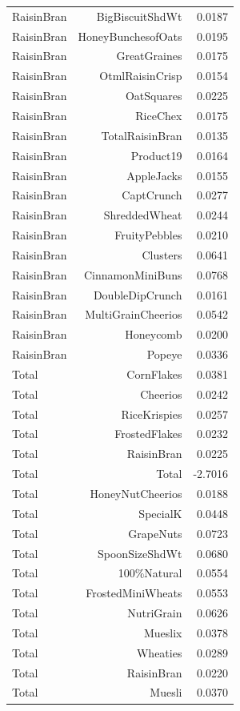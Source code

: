 \begin{longtable}{@{}lrr@{}}
RaisinBran & BigBiscuitShdWt & 0.0187 \\
RaisinBran & HoneyBunchesofOats & 0.0195 \\
RaisinBran & GreatGraines & 0.0175 \\
RaisinBran & OtmlRaisinCrisp & 0.0154 \\
RaisinBran & OatSquares & 0.0225 \\
RaisinBran & RiceChex & 0.0175 \\
RaisinBran & TotalRaisinBran & 0.0135 \\
RaisinBran & Product19 & 0.0164 \\
RaisinBran & AppleJacks & 0.0155 \\
RaisinBran & CaptCrunch & 0.0277 \\
RaisinBran & ShreddedWheat & 0.0244 \\
RaisinBran & FruityPebbles & 0.0210 \\
RaisinBran & Clusters & 0.0641 \\
RaisinBran & CinnamonMiniBuns & 0.0768 \\
RaisinBran & DoubleDipCrunch & 0.0161 \\
RaisinBran & MultiGrainCheerios & 0.0542 \\
RaisinBran & Honeycomb & 0.0200 \\
RaisinBran & Popeye & 0.0336 \\
Total & CornFlakes & 0.0381 \\
Total & Cheerios & 0.0242 \\
Total & RiceKrispies & 0.0257 \\
Total & FrostedFlakes & 0.0232 \\
Total & RaisinBran & 0.0225 \\
Total & Total & -2.7016 \\
Total & HoneyNutCheerios & 0.0188 \\
Total & SpecialK & 0.0448 \\
Total & GrapeNuts & 0.0723 \\
Total & SpoonSizeShdWt & 0.0680 \\
Total & 100\%Natural & 0.0554 \\
Total & FrostedMiniWheats & 0.0553 \\
Total & NutriGrain & 0.0626 \\
Total & Mueslix & 0.0378 \\
Total & Wheaties & 0.0289 \\
Total & RaisinBran & 0.0220 \\
Total & Muesli & 0.0370 \\

\end{longtable}
